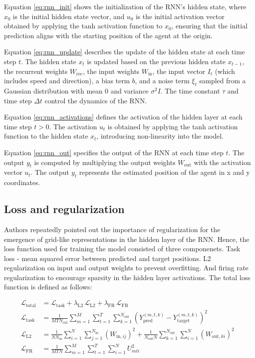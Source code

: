 \documentclass{article}
\begin{document}
Equation \ref{eq:rnn_init} shows the initialization of the RNN's hidden state, where $x_0$ is the initial hidden state vector, and $u_0$ is the initial activation vector obtained by applying the tanh activation function to $x_0$, ensuring that the initial prediction aligns with the starting position of the agent at the origin.

Equation \ref{eq:rnn_update} describes the update of the hidden state at each time step $t$. The hidden state $x_t$ is updated based on the previous hidden state $x_{t-1}$, the recurrent weights $W_{\mathrm{rec}}$, the input weights $W_{\mathrm{in}}$, the input vector $I_t$ (which includes speed and direction), a bias term $b$, and a noise term $\xi_t$ sampled from a Gaussian distribution with mean 0 and variance $\sigma^2 I$. The time constant $\tau$ and time step $\Delta t$ control the dynamics of the RNN.

Equation \ref{eq:rnn_activations} defines the activation of the hidden layer at each time step $t>0$. The activation $u_t$ is obtained by applying the tanh activation function to the hidden state $x_t$, introducing non-linearity into the model.

Equation \ref{eq:rnn_out} specifies the output of the RNN at each time step $t$. The output $y_t$ is computed by multiplying the output weights $W_{\mathrm{out}}$ with the activation vector $u_t$. The output $y_t$ represents the estimated position of the agent in x and y coordinates.



\subsection{Loss and regularization}
Authors repeatedly pointed out the importance of regularization for the emergence of grid-like representations in the hidden layer of the RNN. Hence, the loss function used for training the model consisted of three componenets. Task loss - mean squared error between predicted and target positions. L2 regularization on input and output weights to prevent overfitting. And firing rate regularization to encourage sparsity in the hidden layer activations. The total loss function is defined as follows:

\[
\begin{aligned}
\mathcal{L}_{\text{total}} 
&= \mathcal{L}_{\text{task}} 
   + \lambda_{\text{L2}} \, \mathcal{L}_{\text{L2}} 
   + \lambda_{\text{FR}} \, \mathcal{L}_{\text{FR}} \\[6pt]
\mathcal{L}_{\text{task}} 
&= \frac{1}{M T N_{\text{out}}} 
   \sum_{m=1}^{M} \sum_{t=1}^{T} \sum_{k=1}^{N_{\text{out}}}
   \left( Y_{\text{pred}}^{(m,t,k)} - Y_{\text{target}}^{(m,t,k)} \right)^2 \\[6pt]
\mathcal{L}_{\text{L2}} 
&= \frac{1}{N N_{\text{in}}} \sum_{i=1}^{N} \sum_{j=1}^{N_{\text{in}}} 
   (W_{\text{in},ij})^2
   + \frac{1}{N_{\text{out}} N} \sum_{k=1}^{N_{\text{out}}} \sum_{i=1}^{N}
   (W_{\text{out},ki})^2 \\[6pt]
\mathcal{L}_{\text{FR}} 
&= \frac{1}{M T N} \sum_{m=1}^{M} \sum_{t=1}^{T} \sum_{i=1}^{N} 
   U_{mti}^2
\label{eq:loss}
\end{aligned}
\]
\end{document}
